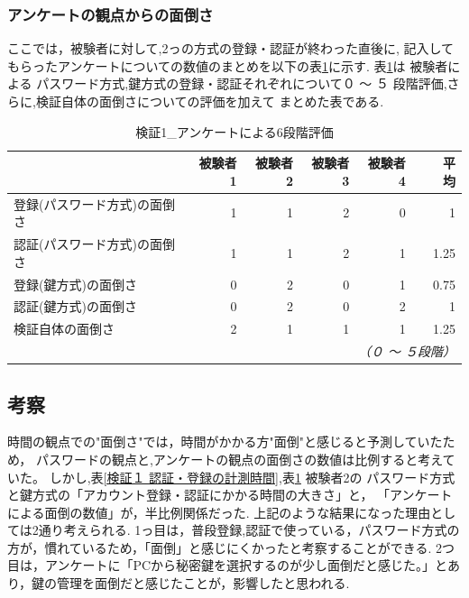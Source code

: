     \subsubsection{アンケートの観点からの面倒さ}
        ここでは，被験者に対して,2っの方式の登録・認証が終わった直後に,
        記入してもらったアンケートについての数値のまとめを以下の表\ref{検証１ アンケートによる６段階評価}に示す.
        表\ref{検証１ アンケートによる６段階評価}は 被験者による パスワード方式,鍵方式の登録・認証それぞれについて０ 〜 ５ 段階評価,さらに,検証自体の面倒さについての評価を加えて まとめた表である.
        \begin{table}[htb]
            \caption{検証1\_アンケートによる6段階評価}
            \label{検証１ アンケートによる６段階評価}
            \begin{tabular}{|l|r|r|r|r|r|} \hline%
                                        & 被験者1 & 被験者2 & 被験者3  & 被験者4 &　平均 \\ \hline%
                登録(パスワード方式)の面倒さ & 1 & 1 & 2 & 0 & 1 \\ \hline
                認証(パスワード方式)の面倒さ & 1 & 1 & 2 & 1 & 1.25 \\ \hline
                登録(鍵方式)の面倒さ       & 0 & 2 & 0 & 1 & 0.75 \\ \hline
                認証(鍵方式)の面倒さ       & 0 & 2 & 0 & 2 & 1 \\ \hline
                検証自体の面倒さ　      & 2 & 1 & 1 & 1 & 1.25 \\ \hline
    
                \multicolumn{6}{r}{\small\it （０ 〜 ５段階）}\\
            \end{tabular}
        \end{table}


 \newpage


 \subsection{考察}
 時間の観点での"面倒さ"では，時間がかかる方"面倒"と感じると予測していたため，
 パスワードの観点と,アンケートの観点の面倒さの数値は比例すると考えていた。
 しかし,表\ref{検証１ 認証・登録の計測時間},表\ref{検証１ アンケートによる６段階評価} 被験者2の
 パスワード方式と鍵方式の「アカウント登録・認証にかかる時間の大きさ」と，
 「アンケートによる面倒の数値」が，半比例関係だった.
 上記のような結果になった理由としては2通り考えられる.
 1っ目は，普段登録,認証で使っている，パスワード方式の方が，慣れているため，「面倒」と感じにくかったと考察することができる.
 2つ目は，アンケートに「PCから秘密鍵を選択するのが少し面倒だと感じた。」とあり，鍵の管理を面倒だと感じたことが，影響したと思われる.

